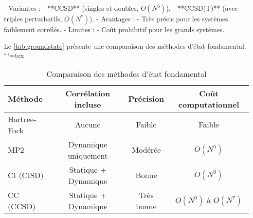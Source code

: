 \documentclass[12pt,a4paper]{report}
\numberwithin{equation}{section}
\numberwithin{figure}{section}
\numberwithin{table}{section}
\begin{document}
\begin{markdown}
   - Variantes :
     - **CCSD** (singles et doubles, $O(N^6)$).
     - **CCSD(T)** (avec triples perturbatifs, $O(N^7)$).
   - Avantages :
     - Très précis pour les systèmes faiblement corrélés.
   - Limites :
     - Coût prohibitif pour les grands systèmes.

Le \autoref{tab:groundstate} présente une comparaison des méthodes d'état fondamental.
```{=tex}
\begin{table}[htpb]
\centering
\caption{Comparaison des méthodes d'état fondamental}
\begin{tabular}{@{}lccc@{}}
\toprule
\textbf{Méthode}       & \textbf{Corrélation incluse} & \textbf{Précision}  & \textbf{Coût computationnel} \\ \midrule
Hartree-Fock           & Aucune                      & Faible              & Faible                       \\
MP2                    & Dynamique uniquement        & Modérée             & $O(N^5)$                     \\
CI (CISD)              & Statique + Dynamique        & Bonne               & $O(N^6)$                     \\
CC (CCSD)              & Statique + Dynamique        & Très bonne          & $O(N^6)$ à $O(N^7)$          \\ \bottomrule
\end{tabular}
\label{tab:groundstate}
\end{table}


\end{markdown}
\end{document}
